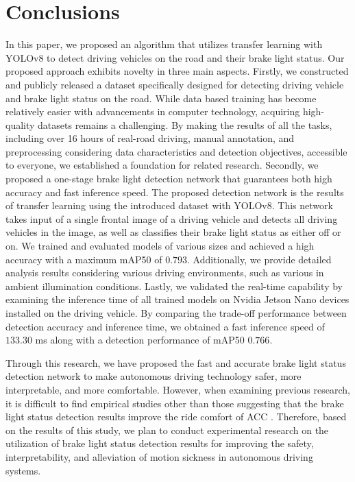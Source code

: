 \section{Conclusions}
\label{sec:conclusions}


In this paper, we proposed an algorithm that utilizes transfer learning with YOLOv8 to detect driving vehicles on the road and their brake light status.
Our proposed approach exhibits novelty in three main aspects.
Firstly, we constructed and publicly released a dataset specifically designed for detecting driving vehicle and brake light status on the road.
While data based training has become relatively easier with advancements in computer technology, acquiring high-quality datasets remains a challenging.
By making the results of all the tasks, including over 16 hours of real-road driving, manual annotation, and preprocessing considering data characteristics and detection objectives, accessible to everyone, we established a foundation for related research.
Secondly, we proposed a one-stage brake light detection network that guarantees both high accuracy and fast inference speed.
The proposed detection network is the results of transfer learning using the introduced dataset with YOLOv8.
This network takes input of a single frontal image of a driving vehicle and detects all driving vehicles in the image, as well as classifies their brake light status as either off or on.
We trained and evaluated models of various sizes and achieved a high accuracy with a maximum mAP50 of $0.793$.
Additionally, we provide detailed analysis results considering various driving environments, such as various in ambient illumination conditions.
Lastly, we validated the real-time capability by examining the inference time of all trained models on Nvidia Jetson Nano devices installed on the driving vehicle.
By comparing the trade-off performance between detection accuracy and inference time, we obtained a fast inference speed of $133.30$ ms along with a detection performance of mAP50 $0.766$.

Through this research, we have proposed the fast and accurate brake light status detection network to make autonomous driving technology safer, more interpretable, and more comfortable.
However, when examining previous research, it is difficult to find empirical studies other than those suggesting that the brake light status detection results improve the ride comfort of ACC \cite{pirhonen2022predictive}.
Therefore, based on the results of this study, we plan to conduct experimental research on the utilization of brake light status detection results for improving the safety, interpretability, and alleviation of motion sickness in autonomous driving systems.
